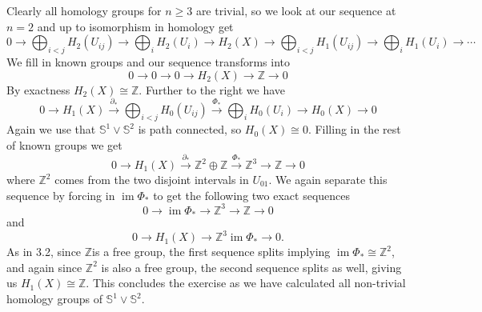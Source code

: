 \documentclass[a4paper, 12pt]{article}
\DeclareMathOperator{\im}{im}
\renewcommand{\S}{\mathbb{S}}
\newcommand{\Z}{\mathbb{Z}}
\newcommand{\iso}{\cong}
\begin{document}
\begin{enumerate}
	 Clearly all homology groups for $n \geq 3$ are trivial, so we look at our sequence at $n=2$ and up to isomorphism in homology get
	 \[
	 0 \xrightarrow{} \bigoplus_{i<j}H_2(U_{ij}) \xrightarrow{} \bigoplus_{i}H_2(U_i) \xrightarrow{} H_2(X) \xrightarrow{} \bigoplus_{i<j}H_1(U_{ij}) \xrightarrow{} \bigoplus_{i}H_1(U_i) \xrightarrow{} \cdots
	 \]
	 We fill in known groups and our sequence transforms into
	 \[
	 0 \xrightarrow{} 0 \xrightarrow{} 0 \xrightarrow{} H_2(X) \xrightarrow{} \Z \xrightarrow{} 0
	 \]
	 By exactness $H_2(X) \iso \Z$. Further to the right we have
	 \[
	 0 \xrightarrow{} H_1(X) \xrightarrow{\partial_*} \bigoplus_{i<j}H_0(U_{ij}) \xrightarrow{\Phi_*} \bigoplus_{i} H_0(U_i) \xrightarrow{} H_0(X) \xrightarrow{} 0
	 \]
	 Again we use that $\S^1\vee\S^2$ is path connected, so $H_0(X) \iso 0$. Filling in the rest of known groups we get
	 \[
	 0 \xrightarrow{} H_1(X) \xrightarrow{\partial_*} \Z^2\oplus\Z \xrightarrow{\Phi_*} \Z^3 \xrightarrow{} \Z \xrightarrow{} 0
	 \]
	 where $\Z^2$ comes from the two disjoint intervals in $U_{01}$.
	 We again separate this sequence by forcing in $\im\Phi_*$ to get the following two exact sequences
	 \[
	 0 \xrightarrow{} \im\Phi_* \xrightarrow{} \Z^3 \xrightarrow{} \Z \xrightarrow{} 0
	 \]
	 and
	 \[
	 0 \xrightarrow{} H_1(X) \xrightarrow{} \Z^3 \im\Phi_* \xrightarrow{} 0.
	 \]
	 As in 3.2, since $\Z$is a free group, the first sequence splits implying $\im\Phi_* \iso \Z^2$, and again since $\Z^2$ is also a free group, the second sequence splits as well, giving us $H_1(X) \iso \Z$. This concludes the exercise as we have calculated all non-trivial homology groups of $\S^1\vee\S^2$.
%	 
%	 
\end{enumerate}
\end{document}
